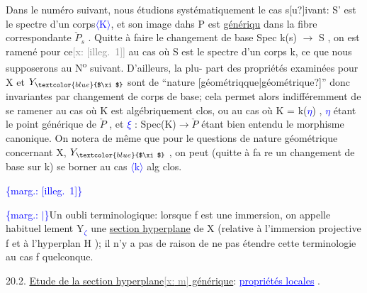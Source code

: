 \documentclass[11pt]{article}
\newcommand{\scanpage}[1]{\par\bigskip\noindent{\small\sffamily[scan #1]}\par}
\newcommand{\mspage}[1]{{\small\sffamily[p.\,#1]}}
\newcommand{\hand}[1]{\textcolor{blue}{#1}}
\newcommand{\inserted}[2][]{\textcolor{blue}{$\langle$#2$\rangle$}}
\newcommand{\margin}[1]{\textcolor{blue}{\{\textsf{marg.:} #1\}}}
\newcommand{\xout}[1]{\textcolor{gray}{[\textsf{x:} #1]}}
\newcommand{\uline}[1]{\underline{#1}}
\newcommand{\unsure}[1]{[#1?]}
\newcommand{\illegible}[1]{[\textsf{illeg.\ #1}]}
\begin{document}
Dans le numéro suivant, nous étudions systématiquement le cas
s\unsure{u}ivant: S' est le spectre d'un corps\inserted{K}, et son image dahs P est \uline{génériqu}
dans la fibre correspondante $\check{P}_s$ . Quitte à faire le changement de base
Spec k(s) $\longrightarrow$ S , on est ramené pour ce\xout{\illegible{1}} au cas où S est le spectre
d'un corps k, ce que nous supposerons au N\textsuperscript{o} suivant. D'ailleurs, la plu-%
part des propriétés examinées pour X et $Y_{\hand{$\xi$}}$ sont de ``nature \unsure{géométriqque|géométrique}''
donc invariantes par changement de corps de base; cela permet alors
indifféremment de se ramener au cas où K est algébriquement clos, ou au
cas où K = k(\hand{$\eta$}) , \hand{$\eta$} étant le point générique de $\check{P}$ , et \hand{$\xi$} : Spec(K)$\to\check{P}$
étant bien entendu le morphisme canonique. On notera de même que pour le
questions de nature géométrique concernant X, $Y_{\hand{$\xi$}}$ , on peut (quitte à fa
re un changement de base sur k) se borner au cas \inserted{k} alg clos.

\mspage{7}

\clearpage
\scanpage{25/8}
\margin{\illegible{1}}

\margin{$|$}Un oubli terminologique: lorsque f est une immersion, on appelle habituel%
lement Y\hand{$_\zeta$} une \uline{section hyperplane} de X (relative à l'immersion projective
f et à l'hyperplan H  ); il n'y a pas de raison de ne pas étendre cette
terminologie au cas f quelconque.

20.2. \uline{Etude de la section hyperplane\xout{m} générique}: \hand{\uline{propriétés locales}} .
\end{document}
